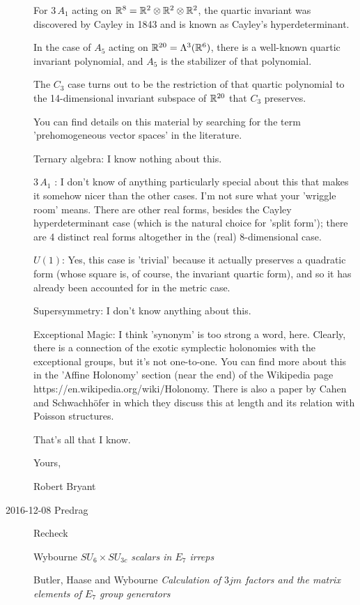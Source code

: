 \begin{description}
For $3\,A_1$ acting on $\mathbb{R}^8 = \mathbb{R}^2\otimes \mathbb{R}^2 \otimes \mathbb{R}^2$, the
        quartic invariant was discovered by Cayley in 1843 and is known as
        Cayley's hyperdeterminant.

In the case of $A_5$ acting on $\mathbb{R}^{20} =
        \Lambda^3(\mathbb{R}^6)$, there is a well-known quartic invariant polynomial,
        and $A_5$ is the stabilizer of that polynomial.

The $C_3$ case turns out
        to be the restriction of that quartic polynomial to the
        14-dimensional invariant subspace of $\mathbb{R}^{20}$ that $C_3$ preserves.

        You can find details on this material by searching for the term
        'prehomogeneous vector spaces' in the literature.

Ternary algebra:  I know nothing about this.

$3\,A_1$ :  I don't know of anything particularly special about this that makes it
somehow nicer than the other cases.  I'm not sure what your 'wriggle room'
means.  There are other real forms, besides the Cayley hyperdeterminant case
(which is the natural choice for 'split form'); there are 4 distinct real
forms altogether in the (real) 8-dimensional case.

$U(1)$:  Yes, this case is 'trivial' because it actually preserves a quadratic
form (whose square is, of course, the invariant quartic form), and so it has
already been accounted for in the metric case.

Supersymmetry:  I don't know anything about this.

Exceptional Magic:  I think 'synonym' is too strong a word, here.  Clearly,
there is a connection of the exotic symplectic holonomies with the
exceptional groups, but it's not one-to-one.  You can find more about this in
the 'Affine Holonomy' section (near the end) of the Wikipedia page
https://en.wikipedia.org/wiki/Holonomy.  There is also a paper by Cahen and
Schwachh{\"o}fer in which they discuss this at length and its
relation with Poisson structures.

        That's all that I know.

        Yours,

        Robert Bryant

\item[2016-12-08 Predrag] Recheck

Wybourne
{\em {$SU_6 \times SU_{3c}$} scalars in $E_7$ irreps}

Butler, Haase and Wybourne
{\em Calculation of {$3jm$} factors and the matrix elements of {$E_7$} group generators}


\end{description}
